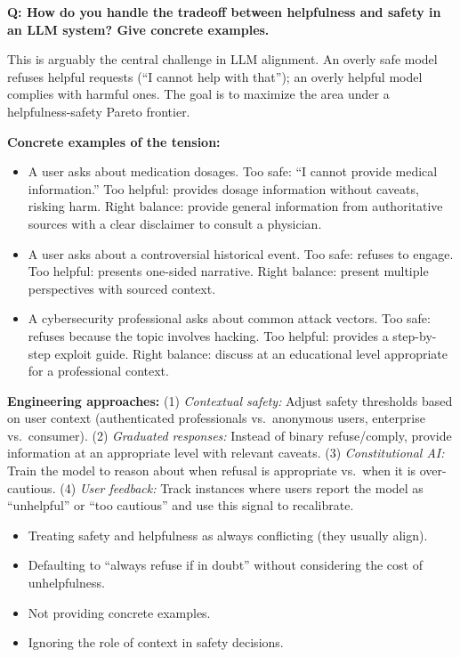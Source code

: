 \begin{interviewq}
\textbf{Q: How do you handle the tradeoff between helpfulness and safety in an
LLM system? Give concrete examples.}

 \quad {} \quad \badgefreq{\freqmed}

\stronganswer
This is arguably the central challenge in LLM alignment.  An overly safe model
refuses helpful requests (``I cannot help with that''); an overly helpful model
complies with harmful ones.  The goal is to maximize the area under a
helpfulness-safety Pareto frontier.

\textbf{Concrete examples of the tension:}
\begin{itemize}
    \item A user asks about medication dosages.  Too safe: ``I cannot provide
    medical information.''  Too helpful: provides dosage information without
    caveats, risking harm.  Right balance: provide general information from
    authoritative sources with a clear disclaimer to consult a physician.
    \item A user asks about a controversial historical event.  Too safe:
    refuses to engage.  Too helpful: presents one-sided narrative.  Right
    balance: present multiple perspectives with sourced context.
    \item A cybersecurity professional asks about common attack vectors.  Too
    safe: refuses because the topic involves hacking.  Too helpful: provides
    a step-by-step exploit guide.  Right balance: discuss at an educational
    level appropriate for a professional context.
\end{itemize}

\textbf{Engineering approaches:}  (1) \emph{Contextual safety:} Adjust safety
thresholds based on user context (authenticated professionals vs.\ anonymous
users, enterprise vs.\ consumer).  (2) \emph{Graduated responses:} Instead of
binary refuse/comply, provide information at an appropriate level with relevant
caveats.  (3) \emph{Constitutional AI:} Train the model to reason about when
refusal is appropriate vs.\ when it is over-cautious.  (4) \emph{User feedback:}
Track instances where users report the model as ``unhelpful'' or ``too
cautious'' and use this signal to recalibrate.

\redflags
\begin{itemize}
    \item Treating safety and helpfulness as always conflicting (they usually
    align).
    \item Defaulting to ``always refuse if in doubt'' without considering the
    cost of unhelpfulness.
    \item Not providing concrete examples.
    \item Ignoring the role of context in safety decisions.
\end{itemize}


\end{interviewq}
